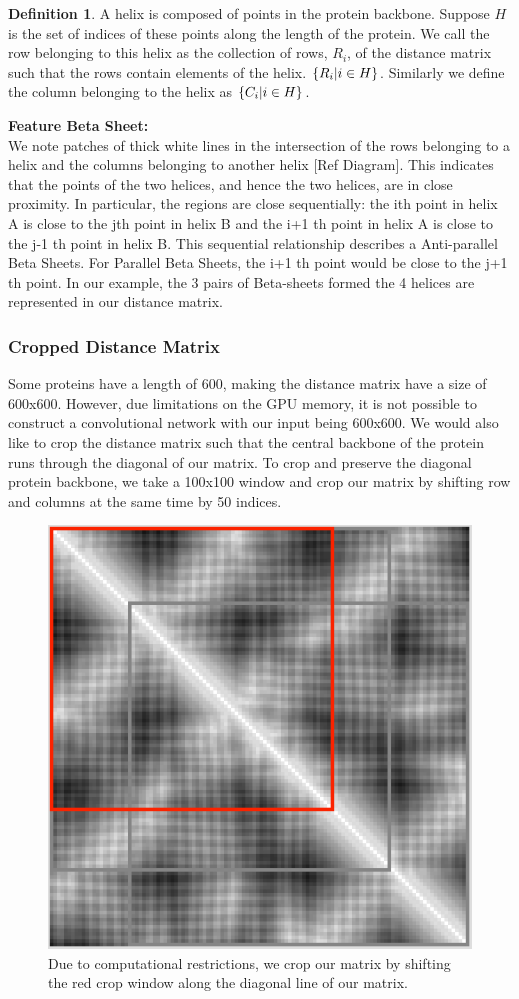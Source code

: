 \documentclass[12pt, a4paper, twocolumn, fullpage]{article}
\theoremstyle{plain}
\theoremstyle{definition}
\newtheorem{defn}{Definition}[section]
\theoremstyle{remark}
\begin{document}
\begin{defn}
A helix is composed of points in the protein backbone. Suppose $H$ is the set of indices of these points along the length of the protein. We call the row belonging to this helix as the collection of rows, $R_{i}$, of the distance matrix such that the rows contain elements of the helix. $\{R_{i} \space | \space i \in H \}$. Similarly we define the column belonging to the helix as $\{C_{i} \space | \space i \in H \}$.
\end{defn}

\noindent
\textbf{Feature Beta Sheet:}\\
We note patches of thick white lines in the intersection of the rows belonging to a helix and the columns belonging to another helix [Ref Diagram]. This indicates that the points of the two helices, and hence the two helices, are in close proximity. In particular, the regions are close sequentially: the ith point in helix A is close to the jth point in helix B and the i+1 th point in helix A is close to the j-1 th point in helix B. This sequential relationship describes a Anti-parallel Beta Sheets. For Parallel Beta Sheets, the i+1 th point would be close to the j+1 th point. In our example, the 3 pairs of Beta-sheets formed the 4 helices are represented in our distance matrix.
\subsubsection{ Cropped Distance Matrix}
Some proteins have a length of 600, making the distance matrix have a size of 600x600. However, due limitations on the GPU memory, it is not possible to construct a convolutional network with our input being 600x600. We would also like to crop the distance matrix such that the central backbone of the protein runs through the diagonal of our matrix. To crop and preserve the diagonal protein backbone, we take a 100x100 window and crop our matrix by shifting row and columns at the same time by 50 indices.

\begin{figure}[h]
    \centering
    \includegraphics[width=.7\linewidth]{cropMat}
    \caption{Due to computational restrictions, we crop our matrix by shifting the red crop window along the diagonal line of our matrix.}
    \label{cropMat}
\end{figure}
\end{document}
